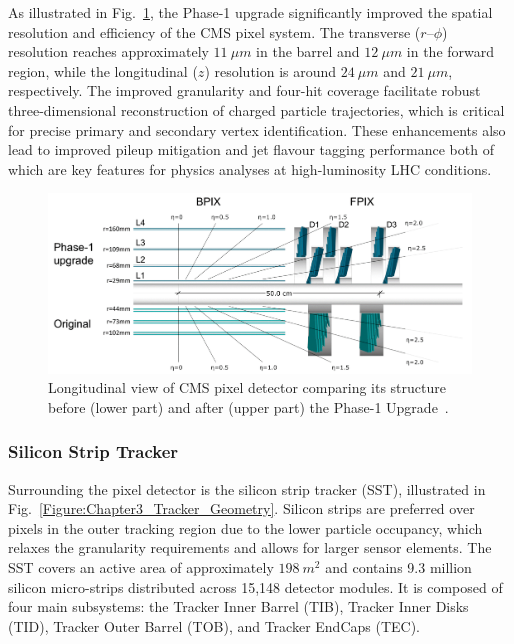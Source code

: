 As illustrated in Fig.~\ref{Figure:Chapter3_Pixel_Upgrade}, the Phase-1 upgrade significantly improved the spatial resolution and efficiency of the CMS pixel system. The transverse ($r$--$\phi$) resolution reaches approximately $11~\unit{\mu m}$ in the barrel and $12~\unit{\mu m}$ in the forward region, while the longitudinal ($z$) resolution is around $24~\unit{\mu m}$ and $21~\unit{\mu m}$, respectively. The improved granularity and four-hit coverage facilitate robust three-dimensional reconstruction of charged particle trajectories, which is critical for precise primary and secondary vertex identification. These enhancements also lead to improved pileup mitigation and jet flavour tagging performance both of which are key features for physics analyses at high-luminosity LHC conditions.

\begin{figure}[h]
\centering
\includegraphics[width= 1\textwidth]{Figures/Chapter3/CMS_Pixel_Upgrade.pdf}
\caption{Longitudinal view of CMS pixel detector comparing its structure before (lower part) and after (upper part) the Phase-1 Upgrade~\cite{LHC_Run3}.}
\label{Figure:Chapter3_Pixel_Upgrade}
\end{figure}

\subsubsection{Silicon Strip Tracker}

Surrounding the pixel detector is the silicon strip tracker (SST), illustrated in Fig.~\ref{Figure:Chapter3_Tracker_Geometry}. Silicon strips are preferred over pixels in the outer tracking region due to the lower particle occupancy, which relaxes the granularity requirements and allows for larger sensor elements. The SST covers an active area of approximately $198~\unit{m}^2$ and contains 9.3 million silicon micro-strips distributed across 15,148 detector modules. It is composed of four main subsystems: the Tracker Inner Barrel (TIB), Tracker Inner Disks (TID), Tracker Outer Barrel (TOB), and Tracker EndCaps (TEC).

